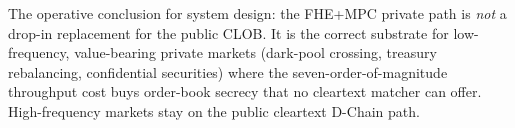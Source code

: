 The operative conclusion for system design: the FHE+MPC private path is
\emph{not} a drop-in replacement for the public CLOB. It is the correct
substrate for low-frequency, value-bearing private markets (dark-pool
crossing, treasury rebalancing, confidential securities) where the
seven-order-of-magnitude throughput cost buys order-book secrecy that no
cleartext matcher can offer. High-frequency markets stay on the public
cleartext D-Chain path.

